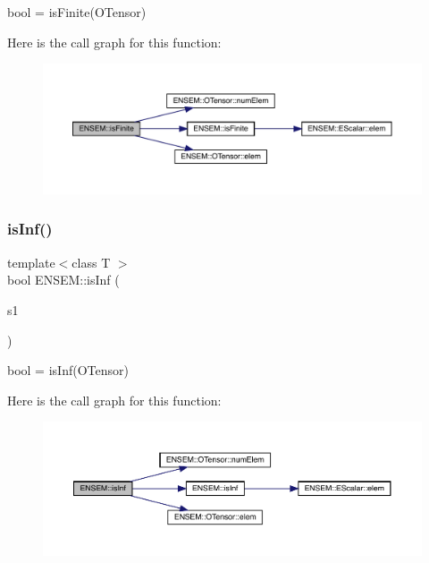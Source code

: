 bool = is\+Finite(\+O\+Tensor) 

Here is the call graph for this function\+:\nopagebreak
\begin{figure}[H]
\begin{center}
\leavevmode
\includegraphics[width=350pt]{de/d87/group__obstensor_ga79f475f3909487c15b04b4561acc06ef_cgraph}
\end{center}
\end{figure}
\mbox{\label{group__obstensor_ga67d316c95a82bf37cc7607cd64e039a1}} 
\subsubsection{\texorpdfstring{isInf()}{isInf()}}
{\footnotesize\ttfamily template$<$class T $>$ \\
bool E\+N\+S\+E\+M\+::is\+Inf (\begin{DoxyParamCaption}\item[{const \mbox{\hyperlink{classENSEM_1_1OTensor}{O\+Tensor}}$<$ T $>$ \&}]{s1 }\end{DoxyParamCaption})}



bool = is\+Inf(\+O\+Tensor) 

Here is the call graph for this function\+:\nopagebreak
\begin{figure}[H]
\begin{center}
\leavevmode
\includegraphics[width=350pt]{de/d87/group__obstensor_ga67d316c95a82bf37cc7607cd64e039a1_cgraph}
\end{center}
\end{figure}
\mbox{\label{group__obstensor_ga24d19fade61896ac0c88639bd7b00b5a}} 
